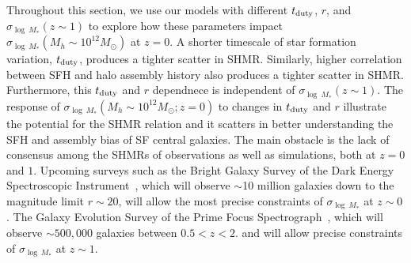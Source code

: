 \documentclass[12pt, letterpaper, preprint, tighten]{aastex62}
\newcommand{\ch}[1]{{\color{orange}{\bf CH:} #1}}
\newcommand{\edt}[1]{{\color{dred}{\bf} #1}}
\newcommand{\tduty}{t_{\rm duty}}
\newcommand{\logsfr}{\log\mathrm{SFR}}
\begin{document}
\edt{
    Throughout this section, we use our models with different $\tduty$, $r$, and
$\sigma_{\log~M_*}(z\sim1)$ to explore how these parameters impact
$\sigma_{\log~M_*}(M_h\sim10^{12}M_\odot)$ at $z=0$. A shorter timescale of
star formation variation, $\tduty$, produces a tighter scatter in SHMR. Similarly,
higher correlation between SFH and halo assembly history also produces a tighter
scatter in SHMR. Furthermore, this $\tduty$ and $r$ dependnece is independent of
$\sigma_{\log~M_*}(z\sim1)$. The response of $\sigma_{\log~M_*}(M_h\sim10^{12}M_\odot; z=0)$
to changes in $\tduty$ and $r$ illustrate the potential for the SHMR relation
and it scatters in better understanding the SFH and assembly bias of SF central
galaxies. The main obstacle is the lack of consensus among the SHMRs of observations 
as well as simulations, both at $z=0$ and $1$. %
Upcoming surveys such as the Bright Galaxy Survey of the Dark
Energy Spectroscopic Instrument~\citep[DESI;][]{desicollaboration2016}, which will
observe $\sim$10 million galaxies down to the magnitude limit $r \sim 20$, will
allow the most precise constraints of $\sigma_{\log\,M_*}$ at $z\sim0$. The Galaxy
Evolution Survey of the Prime Focus Spectrograph~\citep{takada2014,tamura2016}, 
which will observe $\sim500,000$ galaxies between $0.5 < z < 2.$ and will allow
precise constraints of $\sigma_{\log\,M_*}$ at $z\sim1$.
}
\end{document}
